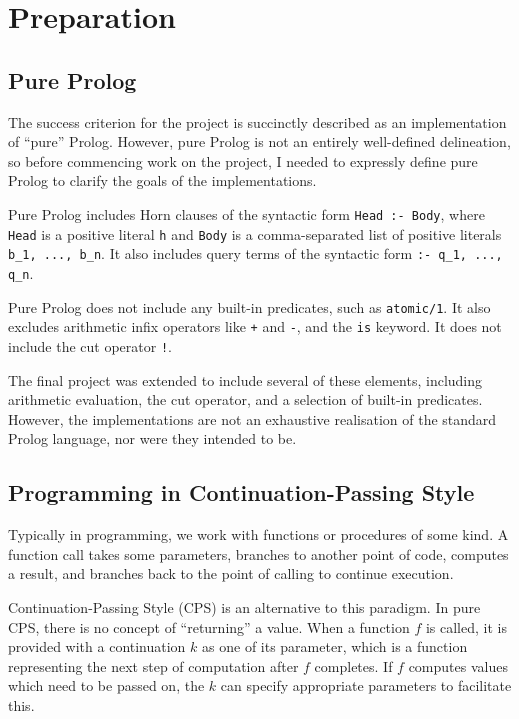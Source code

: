 \documentclass[12pt]{article}
\begin{document}
\section{Preparation}


\subsection{Pure Prolog}

The success criterion for the project is succinctly described as an implementation of ``pure'' Prolog. 
However, pure Prolog is not an entirely well-defined delineation, so before commencing work on the project, I needed to expressly define pure Prolog to clarify the goals of the implementations.

Pure Prolog includes Horn clauses of the syntactic form \verb|Head :- Body|, where \verb|Head| is a positive literal \verb|h| and \verb|Body| is a comma-separated list of positive literals \verb|b_1, ..., b_n|. 
It also includes query terms of the syntactic form \verb|:- q_1, ..., q_n|.

Pure Prolog does not include any built-in predicates, such as \verb|atomic/1|. 
It also excludes arithmetic infix operators like \verb|+| and \verb|-|, and the \verb|is| keyword. 
It does not include the cut operator \verb|!|.

The final project was extended to include several of these elements, including arithmetic evaluation, the cut operator, and a selection of built-in predicates.
However, the implementations are not an exhaustive realisation of the standard Prolog language, nor were they intended to be.

\subsection{Programming in Continuation-Passing Style}

Typically in programming, we work with functions or procedures of some kind. 
A function call takes some parameters, branches to another point of code, computes a result, and branches back to the point of calling to continue execution.

Continuation-Passing Style (CPS) is an alternative to this paradigm. 
In pure CPS, there is no concept of ``returning'' a value. 
When a function $f$ is called, it is provided with a continuation $k$ as one of its parameter, which is a function representing the next step of computation after $f$ completes. 
If $f$ computes values which need to be passed on, the $k$ can specify appropriate parameters to facilitate this.
\end{document}
